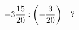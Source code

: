 \documentclass[preview]{standalone}
\begin{document}
\begin{align*}
-3 { 15 \over 20 }  :  \left( - { 3 \over 20 } \right) =  ?
\end{align*}
\end{document}
